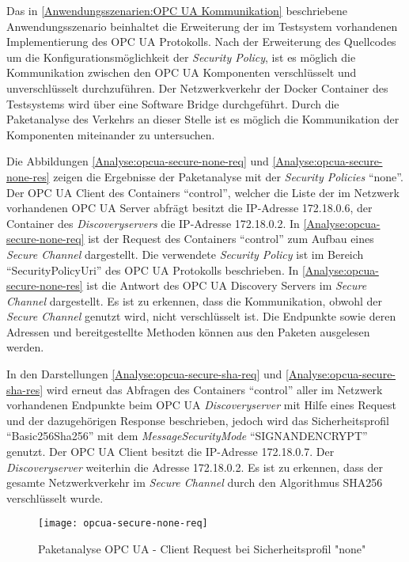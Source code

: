 Das in \autoref{Anwendungsszenarien:OPC UA Kommunikation} beschriebene Anwendungsszenario beinhaltet die Erweiterung der im Testsystem vorhandenen Implementierung des \ac{OPC UA} Protokolls. Nach der Erweiterung des Quellcodes um die Konfigurationsmöglichkeit der \textit{Security Policy}, ist es möglich die Kommunikation zwischen den \ac{OPC UA} Komponenten verschlüsselt und unverschlüsselt durchzuführen. Der Netzwerkverkehr der Docker Container des Testsystems wird über eine Software Bridge durchgeführt. Durch die Paketanalyse des Verkehrs an dieser Stelle ist es möglich die Kommunikation der Komponenten miteinander zu untersuchen. 

Die Abbildungen \autoref{Analyse:opcua-secure-none-req} und \autoref{Analyse:opcua-secure-none-res} zeigen die Ergebnisse der Paketanalyse mit der \textit{Security Policies} "`none"'. Der \ac{OPC UA} Client des Containers "`control"', welcher die Liste der im Netzwerk vorhandenen \ac{OPC UA} Server abfrägt besitzt die \ac{IP}-Adresse 172.18.0.6, der Container des \textit{Discoveryservers} die \ac{IP}-Adresse 172.18.0.2. In \autoref{Analyse:opcua-secure-none-req} ist der Request des Containers "`control"' zum Aufbau eines \textit{Secure Channel} dargestellt. Die verwendete \textit{Security Policy} ist im Bereich "`SecurityPolicyUri"' des \ac{OPC UA} Protokolls beschrieben. In \autoref{Analyse:opcua-secure-none-res} ist die Antwort des \ac{OPC UA} Discovery Servers im \textit{Secure Channel} dargestellt. Es ist zu erkennen, dass die Kommunikation, obwohl der \textit{Secure Channel} genutzt wird, nicht verschlüsselt ist. Die Endpunkte sowie deren Adressen und bereitgestellte Methoden können aus den Paketen ausgelesen werden.

In den Darstellungen \autoref{Analyse:opcua-secure-sha-req} und \autoref{Analyse:opcua-secure-sha-res} wird erneut das Abfragen des Containers "`control"' aller im Netzwerk vorhandenen Endpunkte beim \ac{OPC UA} \textit{Discoveryserver} mit Hilfe eines Request und der dazugehörigen Response beschrieben, jedoch wird das Sicherheitsprofil "`Basic256Sha256"' mit dem \textit{MessageSecurityMode} "`SIGNANDENCRYPT"' genutzt. Der \ac{OPC UA} Client besitzt die \ac{IP}-Adresse 172.18.0.7. Der \textit{Discoveryserver} weiterhin die Adresse 172.18.0.2. Es ist zu erkennen, dass der gesamte Netzwerkverkehr im \textit{Secure Channel} durch den Algorithmus SHA256 verschlüsselt wurde.

\begin{figure}[h]
  \centering
  \texttt{[image: opcua-secure-none-req]}
  \caption{Paketanalyse OPC UA - Client Request bei Sicherheitsprofil "none"} 
  \label{Analyse:opcua-secure-none-req}
\end{figure}

